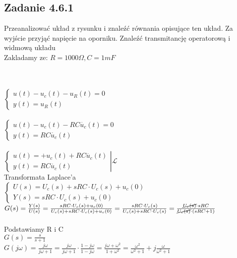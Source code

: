 \pagebreak
\subsection*{Zadanie 4.6.1} {\color{darkgray}
	\begin{figure}[!h]
	\end{figure}
	\noindent Przeanalizować układ z rysunku i znaleźć równania opisujące ten układ. Za wyjście
	przyjąć napięcie na oporniku. Znaleźć transmitancję operatorową i widmową układu\\
	Zakladamy ze: $R=1000\Omega,C=1mF$\\
}\lineh
\\\\
\noindent $\begin{cases}
u(t)-u_c(t)-u_R(t)=0\\
y(t)=u_R(t)
\end{cases}$\\\\
$\begin{cases}
u(t)-u_c(t)-RC\dot{u_c}(t)=0\\
y(t)=RC\dot{u_c}(t)
\end{cases}$\\\\
$\left.\begin{cases}
u(t)=+u_c(t)+RC\dot{u_c}(t)\\
y(t)=RC\dot{u_c}(t)
\end{cases}\right|\mathscr{L}$\\
Transformata Laplace'a\\
$\begin{cases}
U(s)=U_c(s)+sRC\cdot U_c(s)+u_c(0)\\
Y(s)=sRC\cdot U_c(s)+u_c(0)
\end{cases}$\\
$G(s)=\frac{Y(s)}{U(s)}=\frac{sRC\cdot U_c(s)+u_c(0)}{U_c(s)+sRC\cdot U_c(s)+u_c(0)}=\frac{sRC\cdot U_c(s)}{U_c(s)+sRC\cdot U_c(s)}=\frac{\cancel{U_c(s)}\cdot sRC}{\cancel{U_c(s)}\cdot (sRC+1)}$\\\\
Podstawiamy R i C\\
$G(s)=\frac{s}{s+1}$\\
$G(j\omega)=\frac{j\omega}{j\omega+1}=\frac{j\omega}{j\omega+1}\cdot \frac{1-j\omega}{1-j\omega}=\frac{j\omega+\omega^2}{1+\omega^2}=\frac{\omega^2}{\omega^2+1}+j\frac{\omega}{\omega^2+1}$




